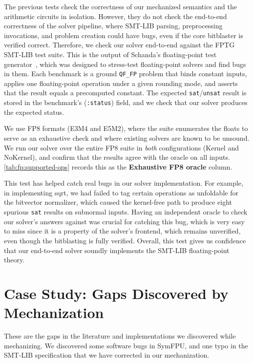 The previous tests check the correctness of our mechanized semantics and the arithmetic circuits in isolation.
However, they do not check the end-to-end correctness of the solver pipeline,
where SMT-LIB parsing, preprocessing invocations, and problem creation
could have bugs, even if the core bitblaster is verified correct.
Therefore, we check our solver end-to-end against the FPTG SMT-LIB test suite.
This is the output of Schanda's floating-point test generator~\cite{symfpu},
which was designed to stress-test floating-point solvers and find bugs in them.
Each benchmark is a ground \texttt{QF\_FP} problem that binds constant inputs, applies one floating-point
operation under a given rounding mode, and asserts that the result equals a
precomputed constant. The expected \texttt{sat}/\texttt{unsat} result is stored
in the benchmark's (\texttt{:status}) field, and we check that our solver produces the expected status.

We use FP8 formats (E3M4 and E5M2), where the suite enumerates the floats to
serve as an exhaustive check and where existing solvers are known to be unsound.
We run our solver over the entire FP8 suite in \emph{both} configurations (Kernel and NoKernel),
and confirm that the results agree with the oracle on all inputs.
\cref{tab:fp:supported-ops} records this as the \textbf{Exhaustive FP8 oracle}
column.

This test has helped catch real bugs in our solver implementation.
For example, in implementing sqrt, we had failed to tag certain operations as unfoldable for the bitvector normalizer,
which caused the kernel-free path to produce eight spurious \texttt{sat} results on subnormal inputs.
Having an independent oracle to check our solver's answers against was crucial for catching this bug,
which is very easy to miss since it is a property of the solver's frontend,
which remains unverified, even though the bitblasting is fully verified.
Overall, this test gives us confidence that our end-to-end solver soundly implements the SMT-LIB floating-point theory.

\section{Case Study: Gaps Discovered by Mechanization}
\label{sec:fp:surfaced}

These are the gaps in the literature and implementations we discovered while mechanizing.
We discovered some software bugs in SymFPU, and one typo in the SMT-LIB specification that we have corrected in our mechanization.

